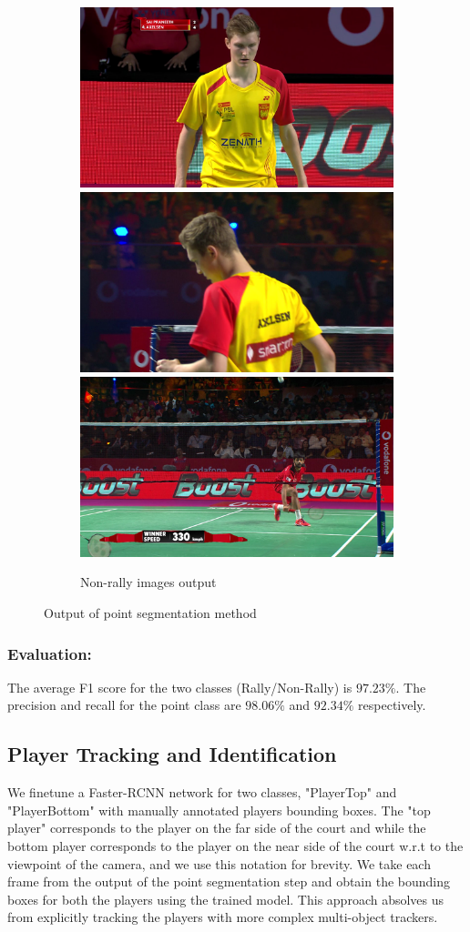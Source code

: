 \documentclass[runningheads,a4paper]{llncs}
\begin{document}
\begin{figure}[h]
\begin{subfigure}{\linewidth}
        \includegraphics[width=.25\linewidth, height=.2\linewidth]{Images/nonrally2.png}\hfill
        \includegraphics[width=.25\linewidth, height=.2\linewidth]{Images/nonrally3.png}\hfill
        \includegraphics[width=.25\linewidth, height=.2\linewidth]{Images/nonrally4.png}
        \caption{\label{fig:rallyimg} Non-rally images output}
    \end{subfigure}
    \caption{\label{fig:rallynonrally} Output of point segmentation method}
\end{figure}

\subsubsection*{Evaluation:} The average F1 score for the two classes (Rally/Non-Rally) is $97.23\%.$ The precision and recall for the point class are $98.06\%$ and $92.34\%$ respectively.
 
\subsection{Player Tracking and Identification}

We finetune a Faster-RCNN \cite{ren2015faster} network for two classes, "PlayerTop" and "PlayerBottom" with manually annotated players bounding boxes. The "top player" corresponds to the player on the far side of the court and while the bottom player corresponds to the player on the near side of the court w.r.t to the viewpoint of the camera, and we use this notation for brevity. We take each frame from the output of the point segmentation step and obtain the bounding boxes for both the players using the trained model. This approach absolves us from explicitly tracking the players with more complex multi-object trackers.
\end{document}
